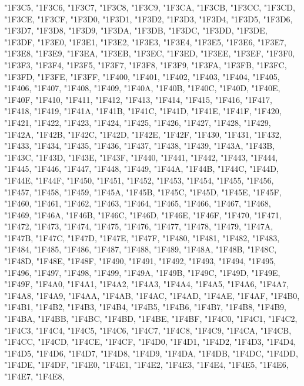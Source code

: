 {	"1F3C5,
	"1F3C6,
	"1F3C7,
	"1F3C8,
	"1F3C9,
	"1F3CA,
	"1F3CB,
	"1F3CC,
	"1F3CD,
	"1F3CE,
	"1F3CF,
	"1F3D0,
	"1F3D1,
	"1F3D2,
	"1F3D3,
	"1F3D4,
	"1F3D5,
	"1F3D6,
	"1F3D7,
	"1F3D8,
	"1F3D9,
	"1F3DA,
	"1F3DB,
	"1F3DC,
	"1F3DD,
	"1F3DE,
	"1F3DF,
	"1F3E0,
	"1F3E1,
	"1F3E2,
	"1F3E3,
	"1F3E4,
	"1F3E5,
	"1F3E6,
	"1F3E7,
	"1F3E8,
	"1F3E9,
	"1F3EA,
	"1F3EB,
	"1F3EC,
	"1F3ED,
	"1F3EE,
	"1F3EF,
	"1F3F0,
	"1F3F3,
	"1F3F4,
	"1F3F5,
	"1F3F7,
	"1F3F8,
	"1F3F9,
	"1F3FA,
	"1F3FB,
	"1F3FC,
	"1F3FD,
	"1F3FE,
	"1F3FF,
	"1F400,
	"1F401,
	"1F402,
	"1F403,
	"1F404,
	"1F405,
	"1F406,
	"1F407,
	"1F408,
	"1F409,
	"1F40A,
	"1F40B,
	"1F40C,
	"1F40D,
	"1F40E,
	"1F40F,
	"1F410,
	"1F411,
	"1F412,
	"1F413,
	"1F414,
	"1F415,
	"1F416,
	"1F417,
	"1F418,
	"1F419,
	"1F41A,
	"1F41B,
	"1F41C,
	"1F41D,
	"1F41E,
	"1F41F,
	"1F420,
	"1F421,
	"1F422,
	"1F423,
	"1F424,
	"1F425,
	"1F426,
	"1F427,
	"1F428,
	"1F429,
	"1F42A,
	"1F42B,
	"1F42C,
	"1F42D,
	"1F42E,
	"1F42F,
	"1F430,
	"1F431,
	"1F432,
	"1F433,
	"1F434,
	"1F435,
	"1F436,
	"1F437,
	"1F438,
	"1F439,
	"1F43A,
	"1F43B,
	"1F43C,
	"1F43D,
	"1F43E,
	"1F43F,
	"1F440,
	"1F441,
	"1F442,
	"1F443,
	"1F444,
	"1F445,
	"1F446,
	"1F447,
	"1F448,
	"1F449,
	"1F44A,
	"1F44B,
	"1F44C,
	"1F44D,
	"1F44E,
	"1F44F,
	"1F450,
	"1F451,
	"1F452,
	"1F453,
	"1F454,
	"1F455,
	"1F456,
	"1F457,
	"1F458,
	"1F459,
	"1F45A,
	"1F45B,
	"1F45C,
	"1F45D,
	"1F45E,
	"1F45F,
	"1F460,
	"1F461,
	"1F462,
	"1F463,
	"1F464,
	"1F465,
	"1F466,
	"1F467,
	"1F468,
	"1F469,
	"1F46A,
	"1F46B,
	"1F46C,
	"1F46D,
	"1F46E,
	"1F46F,
	"1F470,
	"1F471,
	"1F472,
	"1F473,
	"1F474,
	"1F475,
	"1F476,
	"1F477,
	"1F478,
	"1F479,
	"1F47A,
	"1F47B,
	"1F47C,
	"1F47D,
	"1F47E,
	"1F47F,
	"1F480,
	"1F481,
	"1F482,
	"1F483,
	"1F484,
	"1F485,
	"1F486,
	"1F487,
	"1F488,
	"1F489,
	"1F48A,
	"1F48B,
	"1F48C,
	"1F48D,
	"1F48E,
	"1F48F,
	"1F490,
	"1F491,
	"1F492,
	"1F493,
	"1F494,
	"1F495,
	"1F496,
	"1F497,
	"1F498,
	"1F499,
	"1F49A,
	"1F49B,
	"1F49C,
	"1F49D,
	"1F49E,
	"1F49F,
	"1F4A0,
	"1F4A1,
	"1F4A2,
	"1F4A3,
	"1F4A4,
	"1F4A5,
	"1F4A6,
	"1F4A7,
	"1F4A8,
	"1F4A9,
	"1F4AA,
	"1F4AB,
	"1F4AC,
	"1F4AD,
	"1F4AE,
	"1F4AF,
	"1F4B0,
	"1F4B1,
	"1F4B2,
	"1F4B3,
	"1F4B4,
	"1F4B5,
	"1F4B6,
	"1F4B7,
	"1F4B8,
	"1F4B9,
	"1F4BA,
	"1F4BB,
	"1F4BC,
	"1F4BD,
	"1F4BE,
	"1F4BF,
	"1F4C0,
	"1F4C1,
	"1F4C2,
	"1F4C3,
	"1F4C4,
	"1F4C5,
	"1F4C6,
	"1F4C7,
	"1F4C8,
	"1F4C9,
	"1F4CA,
	"1F4CB,
	"1F4CC,
	"1F4CD,
	"1F4CE,
	"1F4CF,
	"1F4D0,
	"1F4D1,
	"1F4D2,
	"1F4D3,
	"1F4D4,
	"1F4D5,
	"1F4D6,
	"1F4D7,
	"1F4D8,
	"1F4D9,
	"1F4DA,
	"1F4DB,
	"1F4DC,
	"1F4DD,
	"1F4DE,
	"1F4DF,
	"1F4E0,
	"1F4E1,
	"1F4E2,
	"1F4E3,
	"1F4E4,
	"1F4E5,
	"1F4E6,
	"1F4E7,
	"1F4E8,
}
